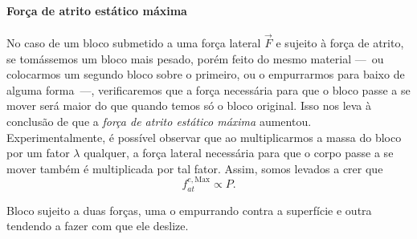 \paragraph{Força de atrito estático máxima} 

No caso de um bloco submetido a uma força lateral $\vec{F}$ e sujeito à força de atrito, se tomássemos um bloco mais pesado, porém feito do mesmo material ---~ou colocarmos um segundo bloco sobre o primeiro, ou o empurrarmos para baixo de alguma forma~---, verificaremos que a força necessária para que o bloco passe a se mover será maior do que quando temos só o bloco original. Isso nos leva à conclusão de que a \emph{força de atrito estático máxima} aumentou. Experimentalmente, é possível observar que ao multiplicarmos a massa do bloco por um fator $\lambda$ qualquer, a força lateral necessária para que o corpo passe a se mover também é multiplicada por tal fator. Assim, somos levados a crer que 
\begin{equation}
     f_{at}^{e,\textrm{Max}} \propto P.
\end{equation}

\begin{marginfigure}
\centering
{}
\caption{Bloco sujeito a duas forças, uma o empurrando contra a superfície e outra tendendo a fazer com que ele deslize.\label{Fig:BlocoEmpurradoParaBaixo}}
\end{marginfigure}

